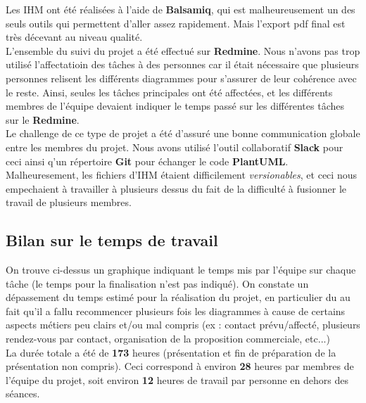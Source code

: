 Les IHM ont été réalisées à l'aide de \textbf{Balsamiq}, qui est malheureusement un des seuls outils qui permettent d'aller assez rapidement. Mais l'export pdf final est très décevant au niveau qualité. \\

L'ensemble du suivi du projet a été effectué sur \textbf{Redmine}. Nous n'avons pas trop utilisé l'affectatioin des tâches à des personnes car il était nécessaire que plusieurs personnes relisent les différents diagrammes pour s'assurer de leur cohérence avec le reste. Ainsi, seules les tâches principales ont été affectées, et les différents membres de l'équipe devaient indiquer le temps passé sur les différentes tâches sur le \textbf{Redmine}.\\

Le challenge de ce type de projet a été d'assuré une bonne communication globale entre les membres du projet. Nous avons utilisé l'outil collaboratif \textbf{Slack} pour ceci ainsi q'un répertoire \textbf{Git} pour échanger le code \textbf{PlantUML}. Malheuresement, les fichiers d'IHM étaient difficilement \textit{versionables}, et ceci nous empechaient à travailler à plusieurs dessus du fait de la difficulté à fusionner le travail de plusieurs membres.

\subsection*{Bilan sur le temps de travail}
  \begin{figure}[H]
    
  \end{figure}
  
On trouve ci-dessus un graphique indiquant le temps mis par l'équipe sur chaque tâche (le temps pour la finalisation n'est pas indiqué).
On constate un dépassement du temps estimé pour la réalisation du projet, en particulier du au fait qu'il a fallu recommencer plusieurs fois les diagrammes à cause de certains aspects métiers peu clairs et/ou mal compris (ex : contact prévu/affecté, plusieurs rendez-vous par contact, organisation de la proposition commerciale, etc...)\\

La durée totale a été de \textbf{173} heures (présentation et fin de préparation de la présentation non compris). Ceci correspond à environ \textbf{28} heures par membres de l'équipe du projet, soit environ \textbf{12} heures  de travail par personne en dehors des séances.\\

